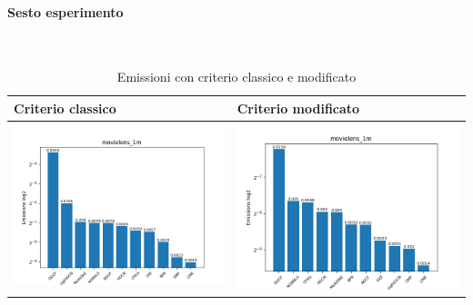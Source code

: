 \paragraph{Sesto esperimento} \textcolor{white}{.}\\
\begin{table}[H]
    \centering
    \footnotesize
    \setlength\tabcolsep{0pt}
    \begin{tabularx}{\textwidth}{|X|X|}
        \hline
        \textbf{Criterio classico} & \textbf{Criterio modificato} \\
        \hline
        \includegraphics[width=\linewidth, trim=0 0 0 0]{images/emissions_movielens_1m_30_7_earlyClassic.png} &
        \includegraphics[width=\linewidth, trim=0 0 0 0]{images/emissions_movielens_1m_30_7_earlyModified.png} \\
        \hline
    \end{tabularx}
    \caption{Emissioni con criterio classico e modificato}
    \label{tab:emissions_info}
\end{table}



